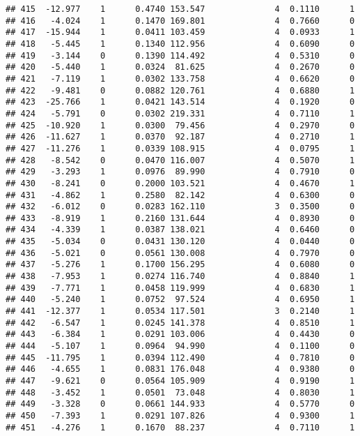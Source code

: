 \documentclass[
]{article}
\begin{document}
\begin{verbatim}
## 415  -12.977    1      0.4740 153.547              4  0.1110      1
## 416   -4.024    1      0.1470 169.801              4  0.7660      0
## 417  -15.944    1      0.0411 103.459              4  0.0933      1
## 418   -5.445    1      0.1340 112.956              4  0.6090      0
## 419   -3.144    0      0.1390 114.492              4  0.5310      0
## 420   -5.440    1      0.0324  81.625              4  0.2670      0
## 421   -7.119    1      0.0302 133.758              4  0.6620      0
## 422   -9.481    0      0.0882 120.761              4  0.6880      1
## 423  -25.766    1      0.0421 143.514              4  0.1920      0
## 424   -5.791    0      0.0302 219.331              4  0.7110      1
## 425  -10.920    1      0.0300  79.456              4  0.2970      0
## 426  -11.627    1      0.0370  92.187              4  0.2710      1
## 427  -11.276    1      0.0339 108.915              4  0.0795      1
## 428   -8.542    0      0.0470 116.007              4  0.5070      1
## 429   -3.293    1      0.0976  89.990              4  0.7910      0
## 430   -8.241    0      0.2000 103.521              4  0.4670      1
## 431   -4.862    1      0.2580  82.142              4  0.6300      0
## 432   -6.012    0      0.0283 162.110              3  0.3500      0
## 433   -8.919    1      0.2160 131.644              4  0.8930      0
## 434   -4.339    1      0.0387 138.021              4  0.6460      0
## 435   -5.034    0      0.0431 130.120              4  0.0440      0
## 436   -5.021    0      0.0561 130.008              4  0.7970      0
## 437   -5.276    1      0.1700 156.295              4  0.6080      0
## 438   -7.953    1      0.0274 116.740              4  0.8840      1
## 439   -7.771    1      0.0458 119.999              4  0.6830      1
## 440   -5.240    1      0.0752  97.524              4  0.6950      1
## 441  -12.377    1      0.0534 117.501              3  0.2140      1
## 442   -6.547    1      0.0245 141.378              4  0.8510      1
## 443   -6.384    1      0.0291 103.006              4  0.4430      0
## 444   -5.107    1      0.0964  94.990              4  0.1100      0
## 445  -11.795    1      0.0394 112.490              4  0.7810      0
## 446   -4.655    1      0.0831 176.048              4  0.9380      0
## 447   -9.621    0      0.0564 105.909              4  0.9190      1
## 448   -3.452    1      0.0501  73.048              4  0.8030      1
## 449   -3.328    0      0.0661 144.933              4  0.5770      0
## 450   -7.393    1      0.0291 107.826              4  0.9300      1
## 451   -4.276    1      0.1670  88.237              4  0.7110      1

\end{verbatim}
\end{document}
